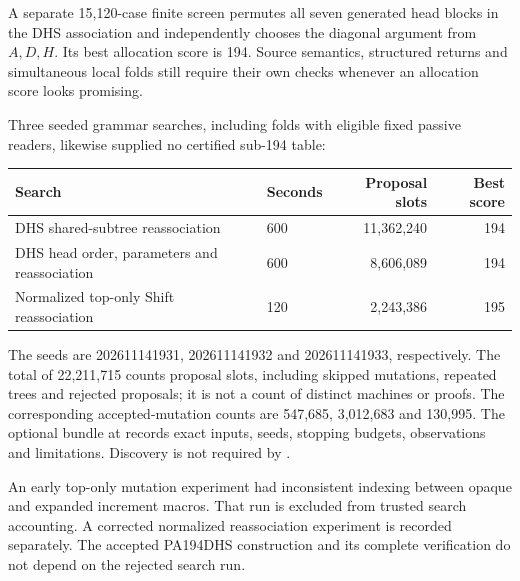 A separate 15,120-case finite screen permutes all seven generated head
blocks in the DHS association and independently chooses the diagonal
argument from $A,D,H$. Its best allocation score is 194. Source semantics,
structured returns and simultaneous local folds still require their own
checks whenever an allocation score looks promising.

Three seeded grammar searches, including folds with eligible fixed
passive readers, likewise supplied no certified sub-194 table:
\begin{center}\small
\begin{tabularx}{\linewidth}{@{}Xp{.12\linewidth}r r@{}}
\toprule Search & Seconds & Proposal slots & Best score\\\midrule
DHS shared-subtree reassociation & 600 & 11,362,240 & 194\\
DHS head order, parameters and reassociation & 600 & 8,606,089 & 194\\
Normalized top-only Shift reassociation & 120 & 2,243,386 & 195\\\bottomrule
\end{tabularx}\end{center}
The seeds are 202611141931, 202611141932 and 202611141933, respectively.
The total of 22,211,715 counts proposal slots, including skipped mutations,
repeated trees and rejected proposals; it is not a count of distinct
machines or proofs. The corresponding accepted-mutation counts are
547,685, 3,012,683 and 130,995. The optional bundle at
 records exact inputs, seeds, stopping
budgets, observations and limitations. Discovery is not required by
.

An early top-only mutation experiment had inconsistent indexing between
opaque and expanded increment macros. That run is excluded from trusted
search accounting. A corrected normalized reassociation experiment is
recorded separately. The accepted PA194DHS construction and its complete
verification do not depend on the rejected search run.
